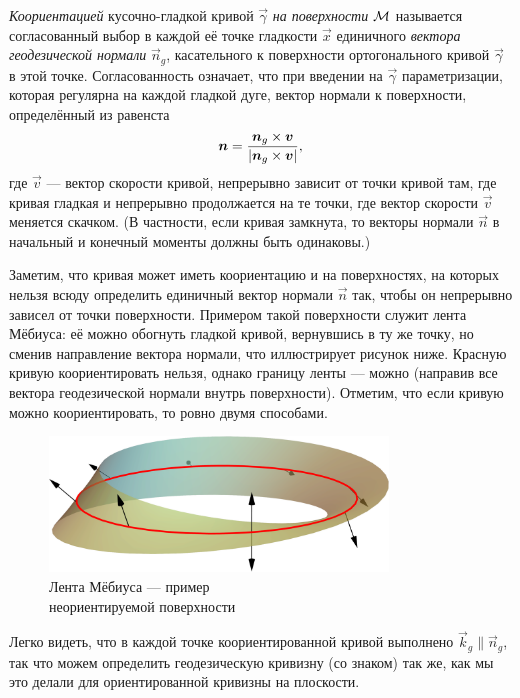 \begin{definition}
	\textit{Коориентацией} кусочно-гладкой кривой $\vec{\gamma}$ \textit{на поверхности} $\mathcal{M}$ называется согласованный выбор в каждой её точке гладкости $\vec{x}$ единичного \textit{вектора геодезической нормали} $\vec{n}_g$, касательного к поверхности ортогонального кривой $\vec{\gamma}$ в этой точке. Согласованность означает, что при введении на $\vec{\gamma}$ параметризации, которая регулярна на каждой гладкой дуге, вектор нормали к поверхности, определённый из равенста
	\[
		\boldsymbol{n} = \frac{\boldsymbol{n}_g \times \boldsymbol{v}}{\left\lvert\boldsymbol{n}_g \times \boldsymbol{v}\right\rvert},
	\]
	где $\vec{v}$ --- вектор скорости кривой, непрерывно зависит от точки кривой там, где кривая гладкая и непрерывно продолжается на те точки, где вектор скорости $\vec{v}$ меняется скачком. (В частности, если кривая замкнута, то векторы нормали $\vec{n}$ в начальный и конечный моменты должны быть одинаковы.)
\end{definition}

Заметим, что кривая может иметь коориентацию и на поверхностях, на которых нельзя всюду определить единичный вектор нормали $\vec{n}$ так, чтобы он непрерывно зависел от точки поверхности. Примером такой поверхности служит лента Мёбиуса: её можно обогнуть гладкой кривой, вернувшись в ту же точку, но сменив направление вектора нормали, что иллюстрирует рисунок ниже. Красную кривую коориентировать нельзя, однако границу ленты --- можно (направив все вектора геодезической нормали внутрь поверхности). Отметим, что если кривую можно коориентировать, то ровно двумя способами.

\begin{figure}[H]
	\centering
	\includegraphics[width=9cm]{./img/MobiusStrip.pdf}
	\caption{Лента Мёбиуса --- пример\\ неориентируемой поверхности}
\end{figure} %

Легко видеть, что в каждой точке коориентированной кривой выполнено $\vec{k}_g \parallel \vec{n}_g$, так что можем определить геодезическую кривизну (со знаком) так же, как мы это делали для ориентированной кривизны на плоскости.

